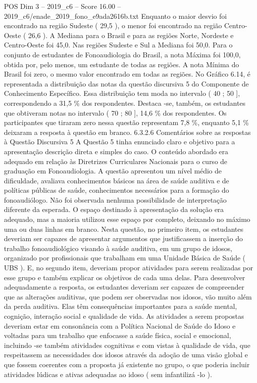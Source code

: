 \begin{textsample}{POS Dim 3 – 2019\_c6 – Score 16.00 – 2019\_c6/enade\_2019\_fono\_e9ada2616b.txt}
Enquanto o maior desvio foi encontrado na região Sudeste ( 29,5 ), o menor foi encontrado na região Centro-Oeste ( 26,6 ).
A Mediana para o Brasil e para as regiões Norte, Nordeste e Centro-Oeste foi 45,0.
Nas regiões Sudeste e Sul a Mediana foi 50,0.
Para o conjunto de estudantes de Fonoaudiologia do Brasil, a nota Máxima foi 100,0, obtida por, pelo menos, um estudante de todas as regiões.
A nota Mínima do Brasil foi zero, o mesmo valor encontrado em todas as regiões.
No Gráfico 6.14, é representada a distribuição das notas da questão discursiva 5 do Componente de Conhecimento Específico.
Essa distribuição tem moda no intervalo ( 40 ; 50 ], correspondendo a 31,5 \% dos respondentes.
Destaca -se, também, os estudantes que obtiveram notas no intervalo ( 70 ; 80 ], 14,6 \% dos respondentes.
Os participantes que tiraram zero nessa questão representam 7,8 \%, enquanto 5,1 \% deixaram a resposta à questão em branco. 6.3.2.6 Comentários sobre as respostas à Questão Discursiva 5 A Questão 5 tinha enunciado claro e objetivo para a apresentação descrição direta e simples do caso.
O conteúdo abordado era adequado em relação às Diretrizes Curriculares Nacionais para o curso de graduação em Fonoaudiologia.
A questão apresentou um nível médio de dificuldade, avaliava conhecimentos básicos na área de saúde auditiva e de políticas públicas de saúde, conhecimentos necessários para a formação do fonoaudiólogo.
Não foi observada nenhuma possibilidade de interpretação diferente da esperada.
O espaço destinado à apresentação da solução era adequado, mas a maioria utilizou esse espaço por completo, deixando no máximo uma ou duas linhas em branco.
Nesta questão, no primeiro item, os estudantes deveriam ser capazes de apresentar argumentos que justificassem a inserção do trabalho fonoaudiológico visando à saúde auditiva, em um grupo de idosos, organizado por profissionais que trabalham em uma Unidade Básica de Saúde ( UBS ).
E, no segundo item, deveriam propor atividades para serem realizadas por esse grupo e também explicar os objetivos de cada uma delas.
Para desenvolver adequadamente a resposta, os estudantes deveriam ser capazes de compreender que as alterações auditivas, que podem ser observadas nos idosos, vão muito além da perda auditiva.
Elas têm consequências importantes para a saúde mental, cognição, interação social e qualidade de vida.
As atividades a serem propostas deveriam estar em consonância com a Política Nacional de Saúde do Idoso e voltadas para um trabalho que enfocasse a saúde física, social e emocional, incluindo -se também atividades cognitivas e com vistas à qualidade de vida, que respeitassem as necessidades dos idosos através da adoção de uma visão global e que fossem coerentes com a proposta já existente no grupo, o que poderia incluir atividades lúdicas e ativas adequadas ao idoso ( sem infantilizá -lo ).

\end{textsample}
